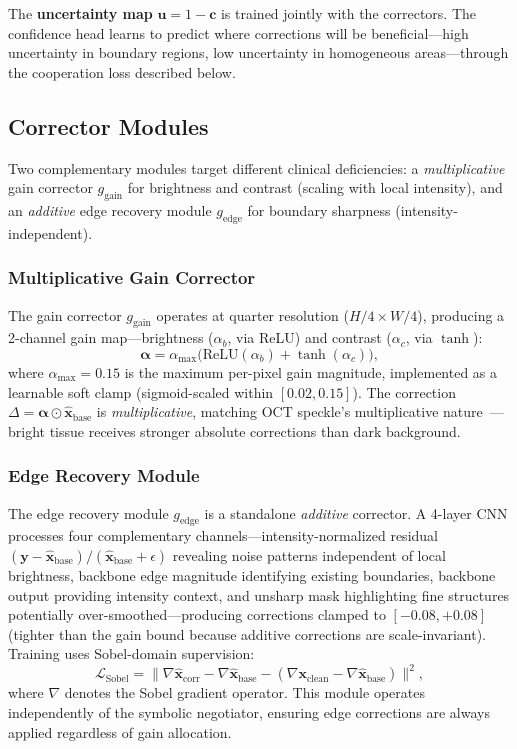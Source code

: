 \documentclass[journal,twoside,web]{ieeecolor}
\begin{document}
The \textbf{uncertainty map} $\mathbf{u} = 1 - \mathbf{c}$ is trained jointly with the correctors. The confidence head learns to predict where corrections will be beneficial---high uncertainty in boundary regions, low uncertainty in homogeneous areas---through the cooperation loss described below.

\subsection{Corrector Modules}
\label{sec:corrector_modules}
Two complementary modules target different clinical deficiencies: a \emph{multiplicative} gain corrector $g_{\mathrm{gain}}$ for brightness and contrast (scaling with local intensity), and an \emph{additive} edge recovery module $g_\text{edge}$ for boundary sharpness (intensity-independent).

\subsubsection{Multiplicative Gain Corrector}
The gain corrector $g_{\mathrm{gain}}$ operates at quarter resolution ($H/4 \times W/4$), producing a 2-channel gain map---brightness ($\alpha_b$, via ReLU) and contrast ($\alpha_c$, via $\tanh$):
\begin{equation}
\boldsymbol{\alpha} = \alpha_{\max}\!\big(\text{ReLU}(\alpha_b) + \tanh(\alpha_c)\big),
\label{eq:gain_map}
\end{equation}
where $\alpha_{\max} = 0.15$ is the maximum per-pixel gain magnitude, implemented as a learnable soft clamp (sigmoid-scaled within $[0.02, 0.15]$). The correction $\Delta = \boldsymbol{\alpha} \odot \hat{\mathbf{x}}_\text{base}$ is \emph{multiplicative}, matching OCT speckle's multiplicative nature~\cite{goodman2007speckle}---bright tissue receives stronger absolute corrections than dark background.

\subsubsection{Edge Recovery Module}
The edge recovery module $g_\text{edge}$ is a standalone \emph{additive} corrector. A 4-layer CNN processes four complementary channels---intensity-normalized residual $(\mathbf{y} - \hat{\mathbf{x}}_\text{base})/(\hat{\mathbf{x}}_\text{base} + \epsilon)$ revealing noise patterns independent of local brightness, backbone edge magnitude identifying existing boundaries, backbone output providing intensity context, and unsharp mask highlighting fine structures potentially over-smoothed---producing corrections clamped to $[-0.08, +0.08]$ (tighter than the gain bound because additive corrections are scale-invariant). Training uses Sobel-domain supervision:
\begin{equation}
\mathcal{L}_\text{Sobel} = \big\|\nabla\hat{\mathbf{x}}_\text{corr} - \nabla\hat{\mathbf{x}}_\text{base} - (\nabla\mathbf{x}_\text{clean} - \nabla\hat{\mathbf{x}}_\text{base})\big\|^2,
\label{eq:sobel_loss}
\end{equation}
where $\nabla$ denotes the Sobel gradient operator. This module operates independently of the symbolic negotiator, ensuring edge corrections are always applied regardless of gain allocation.
\end{document}
